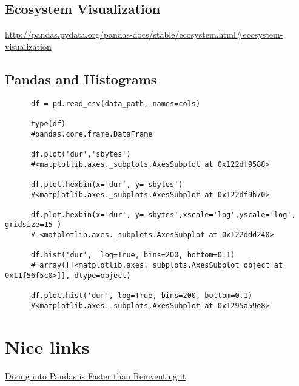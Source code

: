 \documentclass[11pt,a4paper]{article}
\begin{document}
    \subsection{Ecosystem Visualization}
    \href{http://pandas.pydata.org/pandas-docs/stable/ecosystem.html#ecosystem-visualization}{http://pandas.pydata.org/pandas-docs/stable/ecosystem.html\#ecosystem-visualization}\\ 



    \subsection{Pandas and Histograms}
    \begin{lstlisting}
      df = pd.read_csv(data_path, names=cols)

      type(df)
      #pandas.core.frame.DataFrame

      df.plot('dur','sbytes')
      #<matplotlib.axes._subplots.AxesSubplot at 0x122df9588>

      df.plot.hexbin(x='dur', y='sbytes')
      #<matplotlib.axes._subplots.AxesSubplot at 0x122df9b70>
      
      df.plot.hexbin(x='dur', y='sbytes',xscale='log',yscale='log', gridsize=15 )
      # <matplotlib.axes._subplots.AxesSubplot at 0x122ddd240>

      df.hist('dur',  log=True, bins=200, bottom=0.1) 
      # array([[<matplotlib.axes._subplots.AxesSubplot object at 0x11f56f5c0>]], dtype=object)
      
      df.plot.hist('dur', log=True, bins=200, bottom=0.1) 
      #<matplotlib.axes._subplots.AxesSubplot at 0x1295a59e8>
    \end{lstlisting}



\section{Nice links}
\href{http://deanla.com/dont_reinvent_pandas.html}{Diving into Pandas is Faster than Reinventing it}






\end{document}
